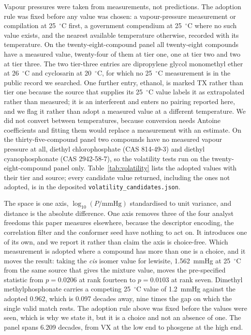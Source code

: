 \documentclass[journal=jacsat,manuscript=suppinfo,margin=1in]{achemso}
\begin{document}
Vapour pressures were taken from measurements, not predictions. The adoption
rule was fixed before any value was chosen: a vapour-pressure measurement or
compilation at 25~$^{\circ}$C first, a government compendium at
25~$^{\circ}$C where no such value exists, and the nearest available
temperature otherwise, recorded with its temperature. On the
twenty-eight-compound panel all twenty-eight compounds have a measured value,
twenty-four of them at tier one, one at tier two and two at tier three. The
two tier-three entries are dipropylene glycol monomethyl ether at
26~$^{\circ}$C and cyclosarin at 20~$^{\circ}$C, for which no 25~$^{\circ}$C
measurement is in the public record we searched. One further entry, ethanol,
is marked TX rather than tier one because the source that supplies its
25~$^{\circ}$C value labels it as extrapolated rather than measured; it is an
interferent and enters no pairing reported here, and we flag it rather than
adopt a measured value at a different temperature. We did not convert between
temperatures, because conversion needs Antoine coefficients and fitting them
would replace a measurement with an estimate. On the thirty-five-compound
panel two compounds have no measured vapour pressure at all, diethyl
chlorophosphate (CAS 814-49-3) and diethyl cyanophosphonate (CAS 2942-58-7),
so the volatility tests run on the twenty-eight-compound panel only.
Table~\ref{tab:volatility} lists the adopted values with their tier and
source; every candidate value returned, including the ones not adopted, is in
the deposited \texttt{volatility\_candidates.json}.

The space is one axis, $\log_{10}(P/\mathrm{mmHg})$ standardised to unit
variance, and distance is the absolute difference. One axis removes three of
the four analyst freedoms this paper measures elsewhere, because the descriptor
encoding, the correlation filter and the conformer seed have nothing to act on.
It introduces one of its own, and we report it rather than claim the axis is
choice-free. Which measurement is adopted where a compound has more than one is
a choice, and it moves the result: taking the \textit{cis} isomer value for
lewisite, 1.562~mmHg at 25~$^{\circ}$C from the same source that gives the
mixture value, moves the pre-specified statistic from $p = 0.0206$ at rank
fourteen to $p = 0.0103$ at rank seven. Dimethyl methylphosphonate carries a
competing 25~$^{\circ}$C value of 1.2~mmHg against the adopted 0.962, which is
0.097 decades away, nine times the gap on which the single valid match rests.
The adoption rule above was fixed before the values were seen, which is why we
state it, but it is a choice and not an absence of one. The panel spans 6.209 decades, from VX at the
low end to phosgene at the high end.
\end{document}
